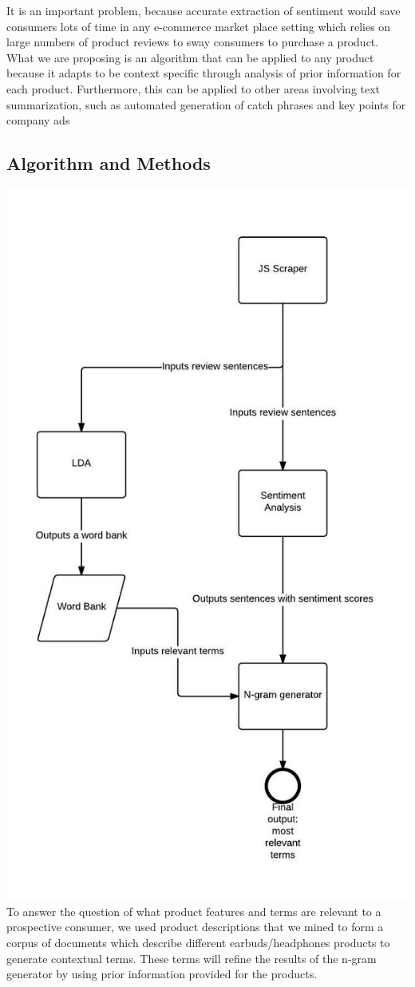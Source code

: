 \documentclass{article}
\begin{document}
It is an important problem, because accurate extraction of sentiment would save consumers lots of time in any e-commerce market place setting which relies on large numbers of product reviews to sway consumers to purchase a product. What we are proposing is an algorithm that can be applied to any product because it adapts to be context specific through analysis of prior information for each product. Furthermore, this can be applied to other areas involving text summarization, such as automated generation of catch phrases and key points for company ads
\subsection{Algorithm and Methods}
\includegraphics[scale = 0.4]{flowchart.jpg} \\
To answer the question of what product features and terms are relevant to a prospective consumer, we used product descriptions that we mined to form a corpus of documents which describe different earbuds/headphones products to generate contextual terms. These terms will refine the results of the n-gram generator by using prior information provided for the products.
\end{document}
